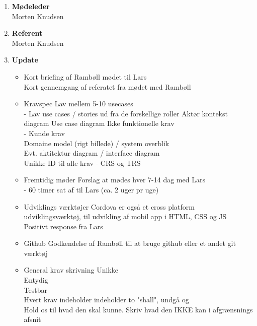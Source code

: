 	\begin{enumerate}
		\itemsep 0.3em 
		\item \textbf{Mødeleder}\\
			Morten Knudsen
		\item \textbf{Referent}\\
			Morten Knudsen

		\item \textbf{Update}
			\begin{itemize}[-]
			\item Kort briefing af Rambøll mødet til Lars\\
			Kort gennemgang af referatet fra mødet med Rambøll	\\
			
			\item Kravspec
			Lav mellem 5-10 usecases \\
			 - Lav use cases / stories ud fra de forskellige roller
			Aktør kontekst diagram
			Use case diagram
			Ikke funktionelle krav \\
			 - Kunde krav \\
			Domaine model (rigt billede) / system overblik \\
			Evt. aktitektur diagram / interface diagram \\
			Unikke ID til alle krav - CRS og TRS\\
						
			\item Fremtidig møder
			Forslag at mødes hver 7-14 dag med Lars \\
			- 60 timer sat af til Lars (ca. 2 uger pr uge) \\
			
			\item Udviklings værktøjer
			Cordova er også et cross platform udviklingsværktøj, til udvikling af mobil app i HTML, CSS og JS \\
			
			Positivt response fra Lars \\
			
			\item Github
			Godkendelse af Rambøll til at bruge github eller et andet git værktøj
			
			\item General krav skrivning
			Unikke \\
			Entydig \\
			Testbar \\
			Hvert krav indeholder indeholder to "shall", undgå og \\
			Hold os til hvad den skal kunne. Skriv hvad den IKKE kan i afgrænsnings afsnit \\
			

\end{itemize}
\end{enumerate}
